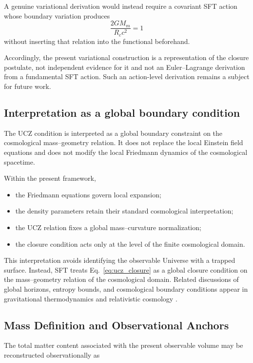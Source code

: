\documentclass[12pt]{article}
\begin{document}
A genuine variational derivation would instead require a covariant SFT
action whose boundary variation produces
\[
\frac{2GM_m}{R_c c^2}=1
\]
without inserting that relation into the functional beforehand.

Accordingly, the present variational construction is a representation
of the closure postulate, not independent evidence for it and not an
Euler--Lagrange derivation from a fundamental SFT action. Such an
action-level derivation remains a subject for future work.


\subsection{Interpretation as a global boundary condition}

The UCZ condition is interpreted as a global boundary constraint on
the cosmological mass--geometry relation. It does not replace the
local Einstein field equations and does not modify the local
Friedmann dynamics of the cosmological spacetime.

Within the present framework,

\begin{itemize}
\item the Friedmann equations govern local expansion;
\item the density parameters retain their standard cosmological
interpretation;
\item the UCZ relation fixes a global mass--curvature normalization;
\item the closure condition acts only at the level of the finite
cosmological domain.
\end{itemize}

This interpretation avoids identifying the observable Universe with a
trapped surface. Instead, SFT treats Eq.~\eqref{eq:ucz_closure} as a
global closure condition on the mass--geometry relation of the cosmological
domain. Related discussions of global horizons, entropy bounds, and
cosmological boundary conditions appear in gravitational thermodynamics and
relativistic cosmology \cite{Bekenstein1973,Hawking1973,Bousso2002,Ellis2007,Padmanabhan2003}.


\subsection{Mass Definition and Observational Anchors}
\label{subsec:mass_observational_anchors}

The total matter content associated with the present observable volume
may be reconstructed observationally as
\end{document}

